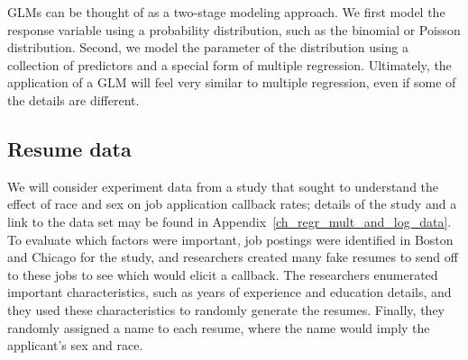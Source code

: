 GLMs can be thought of as a two-stage modeling approach.
We first model the response variable using a probability
distribution, such as the binomial or Poisson distribution.
Second, we model the parameter of the distribution using
a collection of predictors and a special form of multiple
regression.
Ultimately, the application of a GLM will feel very similar
to multiple regression, even if some of the details are
different.


\subsection{Resume data}


\newcommand{\resN}{4870}
\newcommand{\resCallbackProp}{0.0805}
\newcommand{\resCallbackPerc}{8.05\%}
\newcommand{\resNumPred}{8}
\newcommand{\resUniqueNames}{36}
\newcommand{\resHonorsInt}{-2.4998}
\newcommand{\resHonorsCoef}{0.8668}
\newcommand{\resHonorsIntPlusCoef}{-1.6330}
\newcommand{\resHonorsCoefSE}{0.1776}
\newcommand{\resHonorsCoefZ}{4.88}
\newcommand{\resHonorsProb}{0.163}
\newcommand{\resHonorsPerc}{16.3\%}
\newcommand{\resHonorsNotProb}{0.076}
\newcommand{\resHonorsNotPerc}{7.6\%}

We will consider experiment data from a study that sought
to understand the effect of race and sex on job application
callback rates;
details of the study and a link to the data set may be
found in Appendix~\ref{ch_regr_mult_and_log_data}.
To evaluate which factors were important,
job postings were identified in Boston and Chicago
for the study,
and researchers created many fake resumes to send off
to these jobs to see which would elicit a callback.
The researchers enumerated important characteristics,
such as years of
experience and education details, and they used these
characteristics to randomly generate the resumes.
Finally, they randomly assigned a name to each resume,
where the name would imply the applicant's sex and race.

